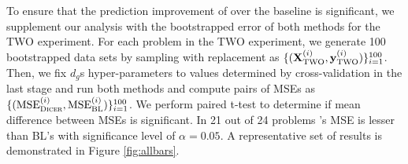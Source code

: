 To ensure that the prediction improvement of \dc{} over the baseline is significant, we supplement our analysis with the bootstrapped error of both methods for the TWO experiment.
For each problem in the TWO experiment, we generate 100 bootstrapped data sets by sampling with replacement as $\{(\mathbf{X}^{(i)}_{\text{TWO}}, \mathbf{y}^{(i)}_{\text{TWO}})\}_{i=1}^{100}$.  
Then, we fix $d_g$s hyper-parameters to values determined by cross-validation in the last stage and run both methods and compute pairs of MSEs as $\{(\text{MSE}^{(i)}_{\text{{\sc Dicer}}}, \text{MSE}^{(i)}_{\text{BL}})\}_{i=1}^{100}$. We perform paired t-test to determine if mean difference between MSEs is significant. In 21 out of 24 problems \dc's MSE is lesser than BL's with significance level of $\alpha = 0.05$. A representative set of results is demonstrated in Figure \ref{fig:allbars}. 

